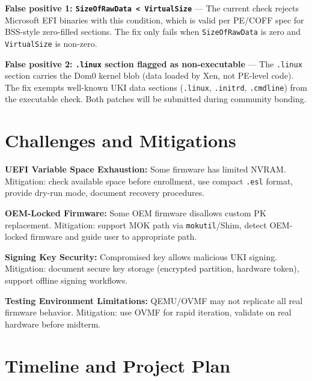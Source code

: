 \documentclass[12pt, a4paper]{article}
\begin{document}
\textbf{False positive 1: \texttt{SizeOfRawData < VirtualSize}} --- The current check rejects Microsoft EFI binaries with this condition, which is valid per PE/COFF spec for BSS-style zero-filled sections. The fix only fails when \texttt{SizeOfRawData} is zero and \texttt{VirtualSize} is non-zero.

\textbf{False positive 2: \texttt{.linux} section flagged as non-executable} --- The \texttt{.linux} section carries the Dom0 kernel blob (data loaded by Xen, not PE-level code). The fix exempts well-known UKI data sections (\texttt{.linux}, \texttt{.initrd}, \texttt{.cmdline}) from the executable check. Both patches will be submitted during community bonding.

\section{Challenges and Mitigations}

\textbf{UEFI Variable Space Exhaustion:} Some firmware has limited NVRAM. Mitigation: check available space before enrollment, use compact \texttt{.esl} format, provide dry-run mode, document recovery procedures.

\textbf{OEM-Locked Firmware:} Some OEM firmware disallows custom PK replacement. Mitigation: support MOK path via \texttt{mokutil}/Shim, detect OEM-locked firmware and guide user to appropriate path.

\textbf{Signing Key Security:} Compromised key allows malicious UKI signing. Mitigation: document secure key storage (encrypted partition, hardware token), support offline signing workflows.

\textbf{Testing Environment Limitations:} QEMU/OVMF may not replicate all real firmware behavior. Mitigation: use OVMF for rapid iteration, validate on real hardware before midterm.

\section{Timeline and Project Plan}
\end{document}
